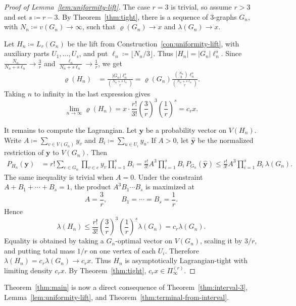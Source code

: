 \documentclass[10pt]{article}
\numberwithin{equation}{section}
\begin{document}
\begin{proof}[Proof of Lemma~\ref{lem:uniformity-lift}]
The case $r=3$ is trivial, so assume $r>3$ and set $s\coloneqq r-3$. By Theorem~\ref{thm:tight}, there is a sequence of $3$-graphs $G_n$, with $N_n\coloneqq v(G_n)\to\infty$, such that $\varrho(G_n)\to x$ and $\lambda(G_n)\to x$.

Let $H_n\coloneqq L_r(G_n)$ be the lift from Construction~\ref{con:uniformity-lift}, with auxiliary parts $U_1,\ldots,U_s$, and put $\ell_n\coloneqq \lfloor N_n/3\rfloor$. Thus $|H_n|=|G_n|\ell_n^s$. Since $\frac{N_n}{N_n+s\ell_n}\to \frac3r$ and $\frac{\ell_n}{N_n+s\ell_n}\to \frac1r$, we get
\begin{align*}
        \varrho(H_n)
        &=
        \frac{|G_n|\ell_n^s}{\binom{N_n+s\ell_n}{r}}  
        =
        \varrho(G_n)\frac{\binom{N_n}{3}\ell_n^s}{\binom{N_n+s\ell_n}{r}}.
\end{align*}
Taking $n$ to infinity in the last expression gives
\[
        \lim_{n\to\infty}\varrho(H_n)
        =
        x\cdot \frac{r!}{3!}\left(\frac3r\right)^3\left(\frac1r\right)^s
        =c_rx.
\]

It remains to compute the Lagrangian. Let $\mathbf{y}$ be a probability vector on $V(H_n)$. Write $A\coloneqq \sum_{v\in V(G_n)}y_v$ and $B_i\coloneqq \sum_{u\in U_i}y_u$. If $A>0$, let $\widehat{\mathbf{y}}$ be the normalized restriction of $\mathbf{y}$ to $V(G_n)$. Then
\begin{align*}
        P_{H_n}(\mathbf{y})
        &=
        r!\sum_{e\in G_n}\prod_{v\in e}y_v\prod_{i=1}^s B_i  
        =
        \frac{r!}{3!}A^3\prod_{i=1}^s B_i\,P_{G_n}(\widehat{\mathbf{y}})  
        \le
        \frac{r!}{3!}A^3\prod_{i=1}^s B_i\,\lambda(G_n).
\end{align*}
The same inequality is trivial when $A=0$. Under the constraint $A+B_1+\cdots+B_s=1$, the product $A^3B_1\cdots B_s$ is maximized at
\[
        A=\frac3r,\qquad B_1=\cdots=B_s=\frac1r.
\]
Hence
\[
        \lambda(H_n) \le \frac{r!}{3!}\left(\frac3r\right)^3\left(\frac1r\right)^s\lambda(G_n) =c_r\lambda(G_n).
\]
Equality is obtained by taking a $G_n$-optimal vector on $V(G_n)$, scaling it by $3/r$, and putting total mass $1/r$ on one vertex of each $U_i$. Therefore $\lambda(H_n)=c_r\lambda(G_n)\to c_rx$. Thus $H_n$ is asymptotically Lagrangian-tight with limiting density $c_rx$. By Theorem~\ref{thm:tight}, $c_rx\in\Pi^{(r)}_\infty$.
\end{proof}

Theorem~\ref{thm:main} is now a direct consequence of Theorem~\ref{thm:interval-3}, Lemma~\ref{lem:uniformity-lift}, and Theorem~\ref{thm:terminal-from-interval}. 
\end{document}

